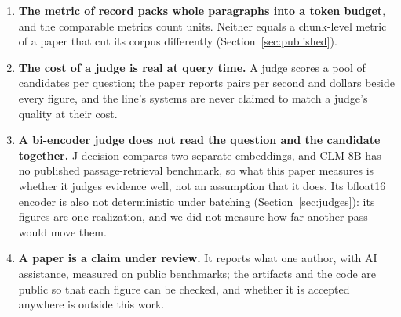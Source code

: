 \begin{enumerate}
        their wording may favour lexical overlap with the evidence; that is one candidate
        reason BM25 gives the largest step there; Phase~16 records this as an interpretation, consistent with the
size of that step but not proved by it, and we did not test it.
  \item \textbf{The metric of record packs whole paragraphs into a token budget}, and the
        comparable metrics count units. Neither equals a chunk-level metric of a paper that cut
        its corpus differently (Section~\ref{sec:published}).
  \item \textbf{The cost of a judge is real at query time.} A judge scores a pool of
        candidates per question; the paper reports pairs per second and dollars beside every
        figure, and the line's systems are never claimed to match a judge's quality at their cost.
  \item \textbf{A bi-encoder judge does not read the question and the candidate together.}
        J-decision compares two separate embeddings, and CLM-8B has no published passage-retrieval
        benchmark, so what this paper measures is whether it judges evidence well, not an
        assumption that it does. Its bfloat16 encoder is also not deterministic under batching
        (Section~\ref{sec:judges}): its figures are one realization, and we did not measure how far
        another pass would move them.
  \item \textbf{A paper is a claim under review.} It reports what one author, with AI assistance,
        measured on public benchmarks; the artifacts and the code are public so that each figure
        can be checked, and whether it is accepted anywhere is outside this work.
\end{enumerate}

